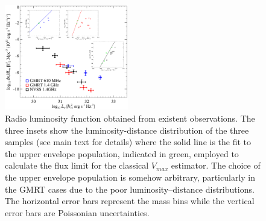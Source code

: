 \documentclass[traditabstract]{aa}
\begin{document}
\begin{appendix}
\begin{figure}[t]
\centering
\includegraphics[width=0.48\textwidth]{figures/RLF_observations.eps}
\caption{Radio luminosity function obtained from existent observations. The three insets show the luminosity-distance distribution of the three samples (see main text for details) where the solid line is the fit to the upper envelope population, indicated in green, employed to calculate the flux limit for the classical $V_{max}$ estimator. The choice of the upper envelope population is somehow arbitrary, particularly in the GMRT cases due to the poor luminosity--distance distributions. The horizontal error bars represent the mass bins while the vertical error bars are Poissonian uncertainties.}
\label{fig:RLFobs}
\end{figure}

\end{appendix}


\end{document}
